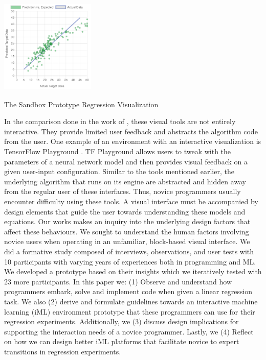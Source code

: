 \documentclass{sigchi-ext}
\begin{document}
\begin{marginfigure}[1.5pc]
\begin{minipage}{\marginparwidth}
     \centering
    \includegraphics[width=4.5cm,height=4.5cm]{figures/Reg_Vis.png}
    \caption{The Sandbox Prototype Regression Visualization}
    \label{fig:Code_output}
    \end{minipage}
\end{marginfigure}

In the comparison done in the work of \cite{nodalo2019building}, these visual tools are not entirely interactive. They provide limited user feedback and abstracts the algorithm code from the user. One example of an environment with an interactive visualization is TensorFlow Playground \cite{smilkov2017neural}.  TF Playground allows users to tweak with the parameters of a neural network model and then provides visual feedback on a given user-input configuration. Similar to the tools mentioned earlier, the underlying algorithm that runs on its engine are abstracted and hidden away from the regular user of these interfaces. Thus, novice programmers usually encounter difficulty using these tools. A visual interface must be accompanied by design elements that guide the user towards understanding these models and equations. Our works makes an inquiry into the underlying design factors that affect these behaviours. We sought to understand the human factors involving novice users when operating in an unfamiliar, block-based visual interface. We did a formative study composed of interviews, observations, and user tests with 10 participants with varying years of experiences both in programming and ML. We developed a prototype based on their insights which we iteratively tested with 23 more participants. In this paper we: (1) Observe and understand how programmers embark, solve and implement code when given a linear regression task. We also (2) derive and formulate guidelines towards an interactive machine learning (iML) environment prototype that these programmers can use for their regression experiments. Additionally, we (3) discuss design implications for supporting the interaction needs of a novice programmer. Lastly, we (4) Reflect on how we can design better iML platforms that facilitate novice to expert transitions in regression experiments.
\end{document}
